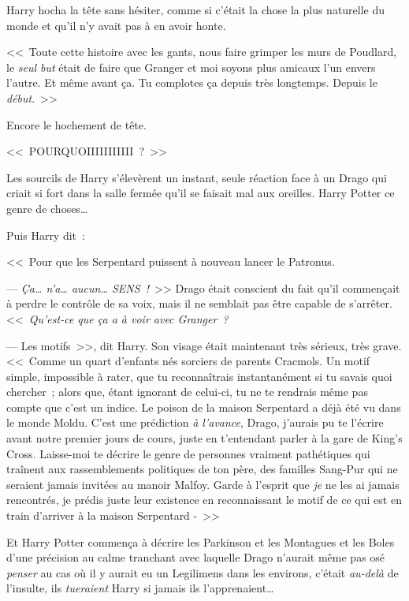 Harry hocha la tête sans hésiter, comme si c'était la chose la plus naturelle du monde et qu'il n'y avait pas à en avoir honte.

<<~Toute cette histoire avec les gants, nous faire grimper les murs de Poudlard, le \emph{seul but} était de faire que Granger et moi soyons plus amicaux l'un envers l'autre. Et même avant ça. Tu complotes ça depuis très longtemps. Depuis le \emph{début}.~>>

Encore le hochement de tête.

<<~POURQUOIIIIIIIIIII~?~>>

Les sourcils de Harry s'élevèrent un instant, seule réaction face à un Drago qui criait si fort dans la salle fermée qu'il se faisait mal aux oreilles.  Harry Potter  ce genre de choses…

Puis Harry dit~:

<<~Pour que les Serpentard puissent à nouveau lancer le Patronus.

--- \emph{Ça… n'a… aucun… SENS~!}~>> Drago était conscient du fait qu'il commençait à perdre le contrôle de sa voix, mais il ne semblait pas être capable de s'arrêter. <<~\emph{Qu'est-ce que ça a à voir avec Granger~?}

--- Les motifs~>>, dit Harry. Son visage était maintenant très sérieux, très grave. <<~Comme un quart d'enfants nés sorciers de parents Cracmols. Un motif simple, impossible à rater, que tu reconnaîtrais instantanément si tu savais quoi chercher~; alors que, étant ignorant de celui-ci, tu ne te rendrais même pas compte que c'est un indice. Le poison de la maison Serpentard a déjà été vu dans le monde Moldu. C'est une prédiction \emph{à l'avance}, Drago, j'aurais pu te l'écrire avant notre premier jours de cours, juste en t'entendant parler à la gare de King's Cross. Laisse-moi te décrire le genre de personnes vraiment pathétiques qui traînent aux rassemblements politiques de ton père, des familles Sang-Pur qui ne seraient jamais invitées au manoir Malfoy. Garde à l'esprit que \emph{je} ne les ai jamais rencontrés, je prédis juste leur existence en reconnaissant le motif de ce qui est en train d'arriver à la maison Serpentard -~>>

Et Harry Potter commença à décrire les Parkinson et les Montagues et les Boles d'une précision au calme tranchant avec laquelle Drago n'aurait même pas osé \emph{penser} au cas où il y aurait eu un Legilimens dans les environs, c'était \emph{au-delà} de l'insulte, ils \emph{tueraient} Harry si jamais ils l'apprenaient…

